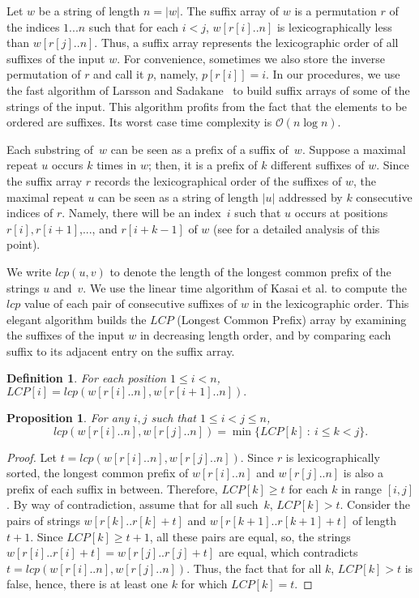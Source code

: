 \documentclass[submission]{dmtcs}
\newcommand{\Ode}{{\mathcal O}}
\newcommand\+[1]{\mathcal{#1}}
\newtheorem{definition}[theorem]{Definition}
\newtheorem{proposition}[theorem]{Proposition}
\begin{document}
\newcommand{\w}[1]{w[#1..n]}
Let $w$ be a string of length $n = |w|$.
The suffix array \cite{manber93} of $w$ is a 
permutation $r$ of the indices $1...n$ such that for
each $i < j$, $\w{r[i]}$ is lexicographically 
less than $\w{r[j]}$.
Thus, a suffix array represents the lexicographic 
order of all suffixes of the input $w$. 
For convenience, sometimes we also store the inverse permutation of
$r$ and call it $p$, namely, $p[r[i]]=i$.
In our procedures, we use the fast 
algorithm of Larsson and Sadakane~\cite{sadakane} 
to build suffix arrays of some of the strings of the input.
This algorithm profits from the fact that the elements 
to be ordered are suffixes. Its worst case 
time complexity is $\Ode(n \log n)$.

Each substring of~$w$ can be seen as a prefix of a suffix of~$w$.
Suppose a maximal repeat $u$ occurs $k$ times in $w$; 
then, it is a prefix of $k$ different suffixes of $w$.
Since the suffix array $r$ records the lexicographical 
order of the suffixes of $w$, the maximal repeat $u$ can 
be seen as a string of length $|u|$ 
addressed by $k$ consecutive indices of $r$.
Namely, there will be an index~$i$ such that $u$ 
occurs at positions $r[i], r[i+1]$,..., and $r[i+k-1]$ of $w$
(see \cite{findmaxr} for a detailed analysis of this point).

We write $lcp(u,v)$ to denote the length of the longest common prefix
of the strings $u$ and~$v$.
We use the linear time algorithm
of Kasai et al. \cite{lcp} to compute 
the $lcp$ value of each pair of consecutive 
suffixes of $w$ in the lexicographic order.
This elegant algorithm builds the 
 $LCP$ (Longest Common Prefix) array by examining the 
suffixes of the input $w$ in decreasing length order,
and by comparing each suffix to its adjacent 
entry on the suffix array.

\begin{definition}
For each position $1 \leq i < n$, 
$LCP[i] = lcp(\w{r[i]}, \w{r[i+1]}).$
\end{definition}

\begin{proposition}\label{prop:lcp}
For any $i, j$ such that $1 \leq i < j \leq n$,
$$lcp(\w{r[i]}, \w{r[j]}) = \min \{ LCP[k] \ : \ i \leq k < j \}.$$
\end{proposition}
\begin{proof}
Let $t = lcp(\w{r[i]}, \w{r[j]})$.
Since $r$ is lexicographically sorted, the longest common prefix of 
$\w{r[i]}$ and $\w{r[j]}$ is also a prefix of each suffix in between. Therefore,
$LCP[k] \geq t$ for each $k$ in range $[i,j]$.
By way of contradiction, assume that for all such~$k$,
$LCP[k] > t$. Consider the pairs of strings $w[r[k]..r[k]+t]$ and
$w[r[k+1]..r[k+1]+t]$ of length $t+1$. Since $LCP[k] \geq t+1$, all these pairs
are equal, so, the strings $w[r[i]..r[i]+t] = w[r[j]..r[j]+t]$ are
equal, which contradicts $t = lcp(\w{r[i]}, \w{r[j]})$. Thus, 
the fact that for all $k$, $LCP[k] > t$ is false, hence,
there is at least one $k$ for which $LCP[k] = t$.
\end{proof}
\end{document}
